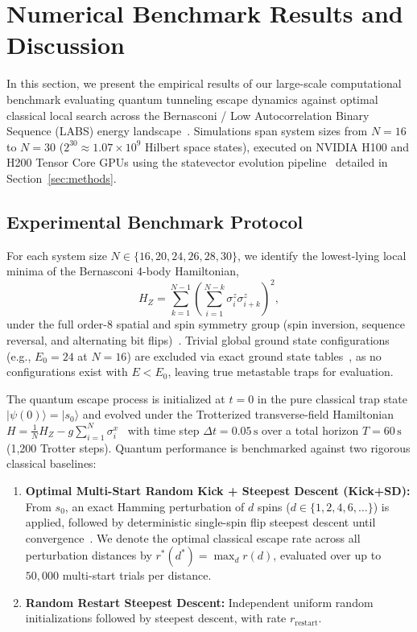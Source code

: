 \section{Numerical Benchmark Results and Discussion}
\label{sec:results}

In this section, we present the empirical results of our large-scale computational benchmark evaluating quantum tunneling escape dynamics against optimal classical local search across the Bernasconi / Low Autocorrelation Binary Sequence (LABS) energy landscape~\cite{bernasconi1987, packebusch2016, mertens1996}. Simulations span system sizes from $N = 16$ to $N = 30$ ($2^{30} \approx 1.07 \times 10^9$ Hilbert space states), executed on NVIDIA H100 and H200 Tensor Core GPUs using the statevector evolution pipeline~\cite{custatevec} detailed in Section~\ref{sec:methods}.

\subsection{Experimental Benchmark Protocol}
\label{subsec:protocol}

For each system size $N \in \{16, 20, 24, 26, 28, 30\}$, we identify the lowest-lying local minima of the Bernasconi 4-body Hamiltonian,
\begin{equation}
H_Z = \sum_{k=1}^{N-1} \left( \sum_{i=1}^{N-k} \sigma_i^z \sigma_{i+k}^z \right)^2,
\end{equation}
under the full order-8 spatial and spin symmetry group (spin inversion, sequence reversal, and alternating bit flips)~\cite{marinari1994, packebusch2016}. Trivial global ground state configurations (e.g., $E_0 = 24$ at $N = 16$) are excluded via exact ground state tables~\cite{packebusch2016}, as no configurations exist with $E < E_0$, leaving true metastable traps for evaluation.

The quantum escape process is initialized at $t = 0$ in the pure classical trap state $|\psi(0)\rangle = |s_0\rangle$ and evolved under the Trotterized transverse-field Hamiltonian $H = \frac{1}{N} H_Z - g \sum_{i=1}^N \sigma_i^x$~\cite{kadowaki1998, trotter1959, suzuki1976} with time step $\Delta t = 0.05\,\text{s}$ over a total horizon $T = 60\,\text{s}$ (1,200 Trotter steps). Quantum performance is benchmarked against two rigorous classical baselines:
\begin{enumerate}
    \item \textbf{Optimal Multi-Start Random Kick + Steepest Descent (Kick+SD):} From $s_0$, an exact Hamming perturbation of $d$ spins ($d \in \{1, 2, 4, 6, \dots\}$) is applied, followed by deterministic single-spin flip steepest descent until convergence~\cite{marti2003, glover1986}. We denote the optimal classical escape rate across all perturbation distances by $r^*(d^*) = \max_d r(d)$, evaluated over up to $50,000$ multi-start trials per distance.
    \item \textbf{Random Restart Steepest Descent:} Independent uniform random initializations followed by steepest descent, with rate $r_{\text{restart}}$.
\end{enumerate}

